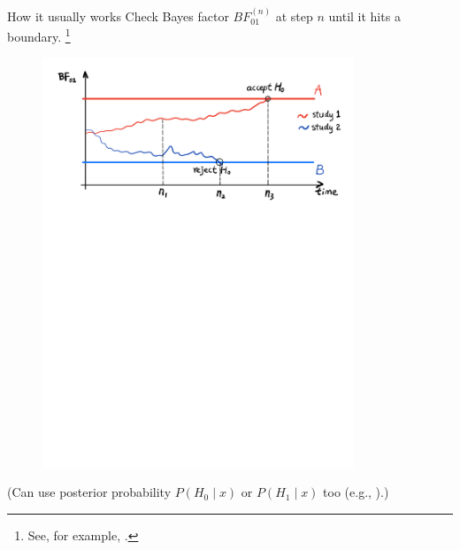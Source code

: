 \documentclass[11pt
,fragile=singleslide
,xcolor=dvipsnames
]{beamer}
\begin{document}
\begin{frame}{How it usually works}
	Check Bayes factor $BF_{01}^{(n)}$ at step $n$ until it hits a boundary. \footnote{See, for example, \cite{barnard1946sequential,wetherill1961bayesian,berger1994unified,berger1988likelihood,berger1997unified,berger1999simultaneous,jha2009bayesian}.}

\begin{figure}
	\includegraphics[width=0.83\textwidth, trim=0 7.3in 0 0.3in, clip]{figures/Bayes_Factor_Sequential_Testing.pdf}
\end{figure}
	
	\pause
	\vspace{0.15in}
	\footnotesize{
	(Can use posterior probability $P(H_0 \mid x)$ or $P(H_1 \mid x)$ too (e.g., \cite{cornfield1966bayesian}).)
}
	
\end{frame}
\end{document}
